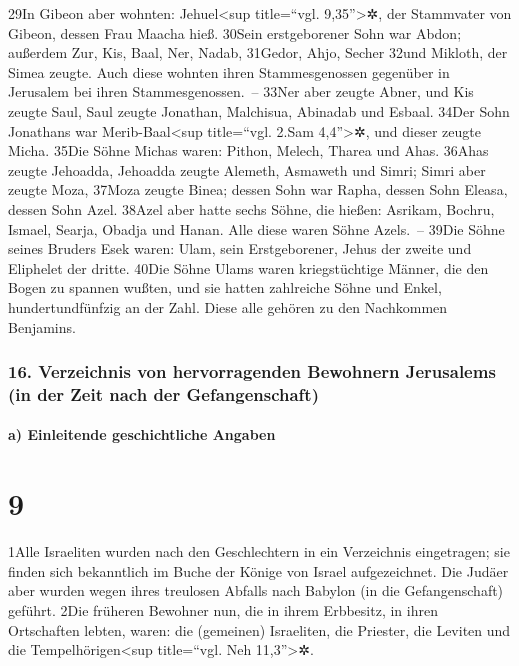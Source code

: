 29In Gibeon aber wohnten: Jehuel\textless sup title=``vgl.
9,35''\textgreater✲, der Stammvater von Gibeon, dessen Frau Maacha hieß.
30Sein erstgeborener Sohn war Abdon; außerdem Zur, Kis, Baal, Ner,
Nadab, 31Gedor, Ahjo, Secher 32und Mikloth, der Simea zeugte. Auch diese
wohnten ihren Stammesgenossen gegenüber in Jerusalem bei ihren
Stammesgenossen.~-- 33Ner aber zeugte Abner, und Kis zeugte Saul, Saul
zeugte Jonathan, Malchisua, Abinadab und Esbaal. 34Der Sohn Jonathans
war Merib-Baal\textless sup title=``vgl. 2.Sam 4,4''\textgreater✲, und
dieser zeugte Micha. 35Die Söhne Michas waren: Pithon, Melech, Tharea
und Ahas. 36Ahas zeugte Jehoadda, Jehoadda zeugte Alemeth, Asmaweth und
Simri; Simri aber zeugte Moza, 37Moza zeugte Binea; dessen Sohn war
Rapha, dessen Sohn Eleasa, dessen Sohn Azel. 38Azel aber hatte sechs
Söhne, die hießen: Asrikam, Bochru, Ismael, Searja, Obadja und Hanan.
Alle diese waren Söhne Azels.~-- 39Die Söhne seines Bruders Esek waren:
Ulam, sein Erstgeborener, Jehus der zweite und Eliphelet der dritte.
40Die Söhne Ulams waren kriegstüchtige Männer, die den Bogen zu spannen
wußten, und sie hatten zahlreiche Söhne und Enkel, hundertundfünfzig an
der Zahl. Diese alle gehören zu den Nachkommen Benjamins.

\hypertarget{verzeichnis-von-hervorragenden-bewohnern-jerusalems-in-der-zeit-nach-der-gefangenschaft}{%
\subsubsection{16. Verzeichnis von hervorragenden Bewohnern Jerusalems
(in der Zeit nach der
Gefangenschaft)}\label{verzeichnis-von-hervorragenden-bewohnern-jerusalems-in-der-zeit-nach-der-gefangenschaft}}

\hypertarget{a-einleitende-geschichtliche-angaben}{%
\paragraph{a) Einleitende geschichtliche
Angaben}\label{a-einleitende-geschichtliche-angaben}}

\hypertarget{section-8}{%
\section{9}\label{section-8}}

1Alle Israeliten wurden nach den Geschlechtern in ein Verzeichnis
eingetragen; sie finden sich bekanntlich im Buche der Könige von Israel
aufgezeichnet. Die Judäer aber wurden wegen ihres treulosen Abfalls nach
Babylon (in die Gefangenschaft) geführt. 2Die früheren Bewohner nun, die
in ihrem Erbbesitz, in ihren Ortschaften lebten, waren: die (gemeinen)
Israeliten, die Priester, die Leviten und die Tempelhörigen\textless sup
title=``vgl. Neh 11,3''\textgreater✲.

